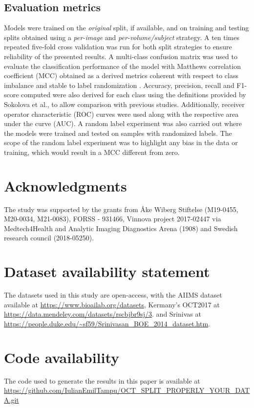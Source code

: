 \documentclass[fleqn,10pt]{wlscirep}
\begin{document}
\subsection*{Evaluation metrics}
Models were trained on the \textit{original} split, if available, and on training and testing splits obtained using a \textit{per-image} and \textit{per-volume/subject} strategy. A ten times repeated five-fold cross validation was run for both split strategies to ensure reliability of the presented results.  A multi-class confusion matrix was used to evaluate the classification performance of the model with Matthews correlation coefficient (MCC) obtained as a derived metrics coherent with respect to class imbalance and stable to label randomization \cite{jurman2012comparison}.  Accuracy, precision, recall and F1-score computed were also derived for each class using the definitions provided by Sokolova et al., \cite{sokolova2009systematic} to allow comparison with previous studies.  Additionally, receiver operator characteristic (ROC) curves were used along with the respective area under the curve (AUC).  A random label experiment was also carried out where the models were trained and tested on samples with randomized labels. The scope of the random label experiment was to highlight any bias in the data or training, which would result in a MCC different from zero. 

\section*{Acknowledgments}
The study was supported by the grants from Åke Wiberg Stiftelse (M19-0455, M20-0034, M21-0083), FORSS - 931466, Vinnova project 2017-02447 via Medtech4Health and Analytic Imaging Diagnostics Arena (1908) and Swedish research council (2018-05250).

\section*{Dataset availability statement}
The datasets used in this study are open-access, with the AIIMS dataset \cite{butola2019volumetric} available at \url{https://www.bioailab.org/datasets},  Kermany’s  OCT2017 \cite{kermany2018large} at \url{https://data.mendeley.com/datasets/rscbjbr9sj/3}. and Srinivas at \url{https://people.duke.edu/~sf59/Srinivasan_BOE_2014_dataset.htm}.

\section*{Code availability}
The code used to generate the results in this paper is available at \url{https://github.com/IulianEmilTampu/OCT_SPLIT_PROPERLY_YOUR_DATA.git}
\end{document}
